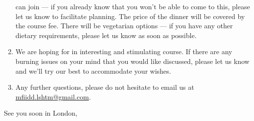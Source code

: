 \documentclass[paper=a4, 11pt]{scrlttr2}
\begin{document}
\begin{letter}{}
\begin{enumerate}
can join --- if you already know that you won't be able to come to this,
please let us know to facilitate planning. The price of the dinner will
be covered by the course fee. There will be vegetarian options --- if you
have any other dietary requirements, please let us know as soon as
possible.
\item We are hoping for in interesting and stimulating course. If there are
any burning issues on your mind that you would like discussed, please
let us know and we'll try our best to accommodate your wishes.
\item Any further questions, please do not hesitate to email us at
\href{mailto:mfiidd.lshtm@gmail.com}{mfiidd.lshtm@gmail.com}.
\end{enumerate}

\closing{See you soon in London,}
\end{letter}
\end{document}

